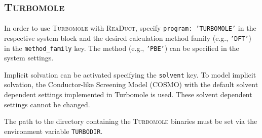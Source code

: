 \documentclass[]{tufte-book}
\begin{document}
\subsection{\textsc{Turbomole}}

In order to use \textsc{Turbomole} with \textsc{ReaDuct}, specify \texttt{program: 'TURBOMOLE'} in the respective system block and the desired
calculation method family (e.g., \texttt{'DFT'}) in the \texttt{method\_family} key.
The method (e.g., \texttt{'PBE'}) can be specified in the system settings.

Implicit solvation can be activated specifying the \texttt{solvent} key.
To model implicit solvation, the Conductor-like Screening Model \cite{cosmo} (COSMO) with the default solvent dependent settings implemented in Turbomole is used.
These solvent dependent settings cannot be changed.

The path to the directory containing the \textsc{Turbomole} binaries must be set via the environment variable \texttt{TURBODIR}.
\end{document}
